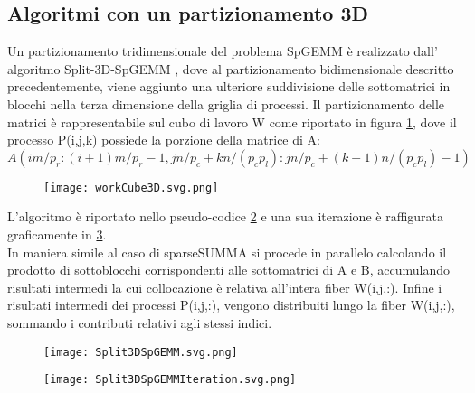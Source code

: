 \subsection{Algoritmi con un partizionamento 3D}
Un partizionamento tridimensionale del problema SpGEMM è realizzato dall'
algoritmo Split-3D-SpGEMM \parencite{Split3DSpGEMM}, dove al partizionamento
bidimensionale descritto precedentemente, viene aggiunto una ulteriore
suddivisione delle sottomatrici in blocchi nella terza dimensione della griglia di processi.
Il partizionamento delle matrici è rappresentabile sul cubo di lavoro W come
riportato in figura \ref{fig:workCube3D}, dove il processo P(i,j,k) possiede la
porzione della matrice di A: 
$A(im/p_r:(i+1)m/p_r - 1, jn/p_c + kn/(p_c p_l ) : jn/p_c + (k + 1)n/(p_c p_l) - 1)$  \\
\begin{figure}[h]
  \caption[rappresentazione 3D della suddivisione della computazione SpGEMM]
  \centering \texttt{[image: workCube3D.svg.png]} \decoRule \label{fig:workCube3D}
\end{figure}
L'algoritmo è riportato nello pseudo-codice \ref{figCode:Split3DSpGEMM} e una
sua iterazione è raffigurata graficamente in \ref{fig:Split3DSpGEMMIteration}.\\

In maniera simile al caso di sparseSUMMA %
si procede in parallelo calcolando il prodotto di sottoblocchi corrispondenti
alle sottomatrici di A e B, accumulando risultati intermedi la cui collocazione
è relativa all'intera fiber W(i,j,:).
Infine i risultati intermedi dei processi P(i,j,:), vengono distribuiti lungo la fiber
W(i,j,:), sommando i contributi relativi agli stessi indici.
\begin{figure}[h] 
  \caption[Split3DSpGEMM, per una risoluzione parallela di SpGEMM con un partizionamento 3D
     nel caso semplificato di una griglia di processi $\sqrt{p/c}~x~\sqrt{p/c}~x~c$]
  \centering \texttt{[image: Split3DSpGEMM.svg.png]} \decoRule \label{figCode:Split3DSpGEMM}
\end{figure}
\begin{figure}[h]
  \caption[esecuzione di un iterazione dell'algoritmo Split3DSpGEMM]
  \centering \texttt{[image: Split3DSpGEMMIteration.svg.png]} 
  \decoRule \label{fig:Split3DSpGEMMIteration}
\end{figure}














